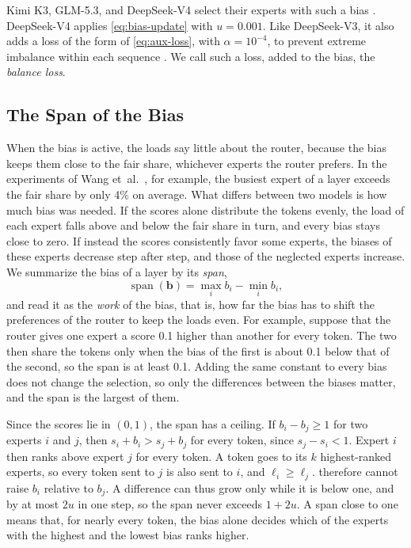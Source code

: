Kimi K3, GLM-5.3, and DeepSeek-V4 select their experts with such a bias \cite{kimi2026k3, zai2026glm53, deepseek2026v4}. DeepSeek-V4 applies \cref{eq:bias-update} with $u = 0.001$. Like DeepSeek-V3, it also adds a loss of the form of \cref{eq:aux-loss}, with $\alpha = 10^{-4}$, to prevent extreme imbalance within each sequence \cite{deepseek2024v3, deepseek2026v4}. We call such a loss, added to the bias, the \emph{balance loss}.

\subsection{The Span of the Bias}
\label{sec:background-span}
When the bias is active, the loads say little about the router, because the bias keeps them close to the fair share, whichever experts the router prefers. In the experiments of Wang et~al.~\cite{wang2024lossfree}, for example, the busiest expert of a layer exceeds the fair share by only 4\% on average. What differs between two models is how much bias was needed. If the scores alone distribute the tokens evenly, the load of each expert falls above and below the fair share in turn, and every bias stays close to zero. If instead the scores consistently favor some experts, the biases of these experts decrease step after step, and those of the neglected experts increase. We summarize the bias of a layer by its \emph{span},
\begin{equation}[eq:bias-span]{}
  \operatorname{span}(\mathbf{b}) = \max_{i} b_i - \min_{i} b_i,
\end{equation}
and read it as the \emph{work} of the bias, that is, how far the bias has to shift the preferences of the router to keep the loads even. For example, suppose that the router gives one expert a score 0.1 higher than another for every token. The two then share the tokens only when the bias of the first is about 0.1 below that of the second, so the span is at least 0.1. Adding the same constant to every bias does not change the selection, so only the differences between the biases matter, and the span is the largest of them.

Since the scores lie in $(0, 1)$, the span has a ceiling. If $b_i - b_j \geq 1$ for two experts $i$ and $j$, then $s_i + b_i > s_j + b_j$ for every token, since $s_j - s_i < 1$. Expert $i$ then ranks above expert $j$ for every token. A token goes to its $k$ highest-ranked experts, so every token sent to $j$ is also sent to $i$, and $\ell_i \geq \ell_j$.  therefore cannot raise $b_i$ relative to $b_j$. A difference can thus grow only while it is below one, and by at most $2u$ in one step, so the span never exceeds $1 + 2u$. A span close to one means that, for nearly every token, the bias alone decides which of the experts with the highest and the lowest bias ranks higher.

